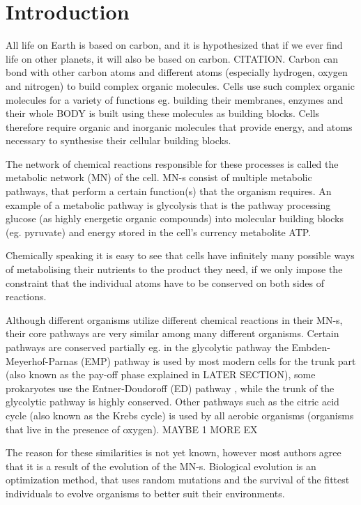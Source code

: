 \documentclass[10pt,a4paper]{article}
\begin{document}
	\section{Introduction}

	All life on Earth is based on carbon, and it is hypothesized that if we ever find life on other planets, it will also be based on carbon. CITATION. Carbon can bond with other carbon atoms and different atoms (especially hydrogen, oxygen and nitrogen) to build complex organic molecules. Cells use such complex organic molecules for a variety of functions eg. building their membranes, enzymes and their whole BODY is built using these molecules as building blocks. Cells therefore require organic and inorganic molecules that provide energy, and atoms necessary to synthesise their cellular building blocks.

	The network of chemical reactions responsible for these processes is called the metabolic network (MN) of the cell. MN-s consist of multiple metabolic pathways, that perform a certain function(s) that the organism requires. An example of a metabolic pathway is glycolysis that is the pathway processing glucose (as highly energetic organic compounds) into molecular building blocks (eg. pyruvate) and energy stored in the cell's currency metabolite ATP.
	
	Chemically speaking it is easy to see that cells have  infinitely many possible ways of metabolising their nutrients to the product they need, if we only impose the constraint that the individual atoms have to be conserved on both sides of reactions.   
	
	Although different organisms utilize different chemical reactions in their MN-s, their core pathways are very similar among many different organisms. Certain pathways are conserved partially  eg. in the glycolytic pathway the Embden-Meyerhof-Parnas (EMP) pathway \cite{EMPpathway} is used by most modern cells for the trunk part (also known as the pay-off phase explained in LATER SECTION),  some prokaryotes  use the Entner-Doudoroff (ED) pathway \cite{EDpathway}, while the trunk of the glycolytic pathway is highly conserved. Other pathways such as the citric acid cycle (also known as the Krebs cycle) is used by all aerobic organisms (organisms that live in the presence of oxygen). MAYBE 1 MORE EX

	The reason for these similarities is not yet known, however most authors agree that it is a result of the evolution of the MN-s. 
	Biological evolution is an optimization method, that uses random mutations and the survival of the fittest individuals to evolve organisms to better suit their environments. 
\end{document}
